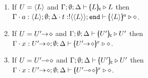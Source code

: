 \begin{proposition}
\begin{enumerate}
\begin{enumerate}
			\item	If $U = \langle L \rangle$ and $\Gamma; \emptyset; \Delta \vdash [\!\!(L)\!\!]_{\mathsf{c}} \triangleright L$ then \\
					$\Gamma \cdot a: \langle L \rangle; \emptyset; \Delta \cdot t: ! \langle \langle L \rangle \rangle ; \mathtt{end} \vdash [\!\!(\langle L \rangle)\!\!]^{a} \triangleright \diamond$.
	
			\item	If $U = U'\!\! \rightarrow\! \diamond$ and  $\Gamma; \emptyset; \Delta \vdash [\!\!(U')\!\!]_{\mathsf{c}} \triangleright U'$ then \\
					$\Gamma \cat x: \shot{U'}; \es;\Delta \proves \mapchar{\shot{U'}}{x} \hastype \Proc$.
	
			\item
					If $U = U'\!\! \multimap\! \diamond$ and   $\Gamma; \emptyset; \Delta \vdash [\!\!(U')\!\!]_{\mathsf{c}} \triangleright U'$ then \\
					$\Gamma \cat x: \shot{U'}; \es;\Delta \proves \mapchar{\lhot{U'}}{x} \hastype \Proc$.
		\end{enumerate}
	\end{enumerate}
\end{proposition}


